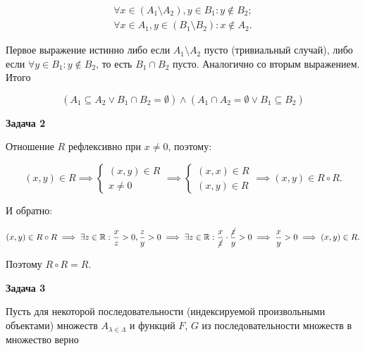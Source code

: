 \begin{gather*}
    \forall x \in (A_1 \setminus A_2), y \in B_1: y \not\in B_2; \\
    \forall x \in A_1, y \in (B_1 \setminus B_2): x \not\in A_2.
\end{gather*}

Первое выражение истинно либо если $A_1 \setminus A_2$ пусто (тривиальный случай), либо если $\forall y \in B_1: y \not\in B_2$, то есть $B_1 \cap B_2$ пусто. Аналогично со вторым выражением. Итого

\begin{equation*}
    (A_1 \subseteq A_2 \lor B_1 \cap B_2 = \emptyset) \land (A_1 \cap A_2 = \emptyset \lor B_1 \subseteq B_2)
\end{equation*}

\begin{center}
    \textbf{Задача 2}
\end{center}        %

Отношение $R$ рефлексивно при $x \ne 0$, поэтому:

\begin{equation*}
    (x, y) \in R
    \implies
    \begin{cases}
        (x, y) \in R \\
        x \ne 0
    \end{cases}
    \implies
    \begin{cases}
        (x, x) \in R \\
        (x, y) \in R
    \end{cases}
    \implies
    (x, y) \in R \circ R.
\end{equation*}

И обратно:

\begin{equation*}
    (x, y) \in R \circ R
    \implies
    \exists z \in \mathbb{R}: \frac{x}{z} > 0, \frac{z}{y} > 0
    \implies
    \exists z \in \mathbb{R}: \frac{x}{\cancel{z}} \cdot \frac{\cancel{z}}{y} > 0
    \implies
    \frac{x}{y} > 0
    \implies
    (x, y) \in R.
\end{equation*}

Поэтому $R \circ R = R$.

\begin{center}
    \textbf{Задача 3}
\end{center}
Пусть для некоторой последовательности (индексируемой произвольными объектами) множеств $A_{\lambda \in \Lambda}$ и функций $F$, $G$ из последовательности множеств в множество верно

